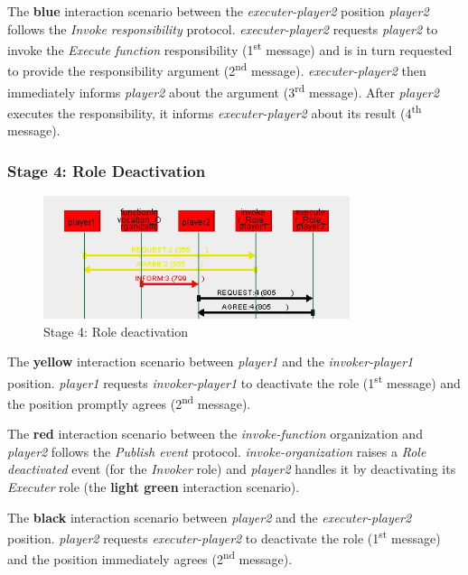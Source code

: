 The \textbf{blue} interaction scenario between the \textit{executer-player2} position \textit{player2} follows the \textit{Invoke responsibility} protocol.
\textit{executer-player2} requests \textit{player2} to invoke the \textit{Execute function} responsibility (1\textsuperscript{st} message) and is in turn requested to provide the responsibility argument (2\textsuperscript{nd} message).
\textit{executer-player2} then immediately informs \textit{player2} about the argument (3\textsuperscript{rd} message).
After \textit{player2} executes the responsibility, it informs \textit{executer-player2} about its result (4\textsuperscript{th} message).

\subsubsection*{Stage 4: Role Deactivation}

\begin{figure}[H]
	\centering
	\includegraphics[width=0.8\textwidth]{images/examples/example1-stage4.png}
	\caption{Stage 4: Role deactivation}
	\label{figure:example1-stage4}
\end{figure}

The \textbf{yellow} interaction scenario between \textit{player1}  and the \textit{invoker-player1} position.
\textit{player1} requests \textit{invoker-player1} to deactivate the role (1\textsuperscript{st} message) and the position promptly agrees (2\textsuperscript{nd} message).

The \textbf{red} interaction scenario between the \textit{invoke-function} organization and \textit{player2} follows the \textit{Publish event} protocol.
\textit{invoke-organization} raises a \textit{Role deactivated} event (for the \textit{Invoker} role) and \textit{player2} handles it by deactivating its \textit{Executer} role (the \textbf{light green} interaction scenario).

The \textbf{black} interaction scenario between \textit{player2} and the \textit{executer-player2} position.
\textit{player2} requests \textit{executer-player2} to deactivate the role (1\textsuperscript{st} message) and the position immediately agrees (2\textsuperscript{nd} message).

